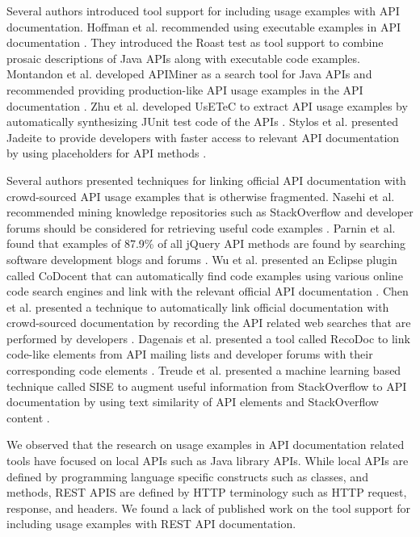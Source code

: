 
Several authors introduced tool support for including usage examples with API documentation. Hoffman et al. recommended using executable examples in API documentation \cite{Hoffman_api_documentation}. They introduced the Roast test as tool support to combine prosaic descriptions of Java APIs along with executable code examples. Montandon et al. developed APIMiner as a search tool for Java APIs and recommended providing production-like API usage examples in the API documentation \cite{montandon2013documenting}. Zhu et al. developed UsETeC to extract API usage examples by automatically synthesizing JUnit test code of the APIs \cite{zhu2014mining}. Stylos et al. presented Jadeite to provide developers with faster access to relevant API documentation by using placeholders for API methods \cite{Jadeite}.

Several authors presented techniques for linking official API documentation with crowd-sourced API usage examples that is otherwise fragmented. Nasehi et al. recommended mining knowledge repositories such as StackOverflow and developer forums should be considered for retrieving useful code examples \cite{Nasehi_what_makes}. Parnin et al. found that examples of 87.9\% of all jQuery API methods are found by searching software development blogs and forums \cite{Parnin_measuring}. Wu et al. presented an Eclipse plugin called CoDocent that can automatically find code examples using various online code search engines and link with the relevant official API documentation \cite{wu2010codocent}. Chen et al. presented a technique to automatically link official documentation with crowd-sourced documentation by recording the API related web searches that are performed by developers \cite{Chen_who_asked}. Dagenais et al. presented a tool called RecoDoc to link code-like elements from API mailing lists and developer forums with their corresponding code elements \cite{dagenais2012recovering}. Treude et al. presented a machine learning based technique called SISE to augment useful information from StackOverflow to API documentation by using text similarity of API elements and StackOverflow content \cite{Treude:2016:AAD:2884781.2884800}.

We observed that the research on usage examples in API documentation related tools have focused on local APIs such as Java library APIs. While local APIs are defined by programming language specific constructs such as classes, and methods, REST APIS are defined by HTTP terminology such as HTTP request, response, and headers. We found a lack of published work on the tool support for including usage examples with REST API documentation.


